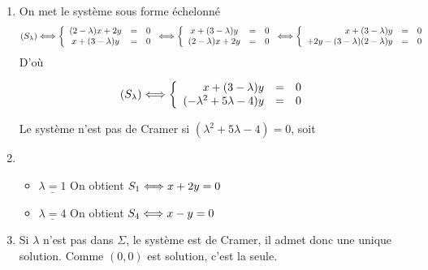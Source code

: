 \documentclass[a4paper, 11pt,reqno]{article}
\begin{document}
\begin{correction}
\begin{enumerate}
\item  On met le système sous forme échelonné
$$(S_\lambda)\Longleftrightarrow  \left\{ \begin{array}{ccc}
(2-\lambda)x +2y & =& 0\\
x +(3-\lambda)y  & =& 0
\end{array}\right.
\Longleftrightarrow 
\left\{ \begin{array}{ccc}
x +(3-\lambda)y  & =& 0\\
(2-\lambda)x +2y & =& 0
\end{array}\right.
\Longleftrightarrow 
\left\{ \begin{array}{rcc}
x +(3-\lambda)y  & =& 0\\
+2y -  (3-\lambda) (2-\lambda) y& =& 0
\end{array}\right.
 $$
 D'où 
 
 $$(S_\lambda)\Longleftrightarrow  \left\{ \begin{array}{rcc}
x +(3-\lambda)y  & =& 0\\
  (-\lambda^2 +5\lambda -4) y& =& 0
\end{array}\right.$$
 
Le système n'est pas de Cramer si  $ (\lambda^2 +5\lambda -4) =0$, soit 
\item \begin{itemize}
\item $\underline{\lambda=1}$
On obtient $S_1 \Longleftrightarrow x+ 2y =0$

\item $\underline{\lambda=4}$
On obtient $S_4 \Longleftrightarrow x-y =0$
\end{itemize}

\item Si $\lambda$ n'est pas dans $ \Sigma$, le système est de Cramer, il admet donc une unique solution. Comme $(0,0)$ est solution, c'est la seule. 
\end{enumerate}
\end{correction}








\end{document}
